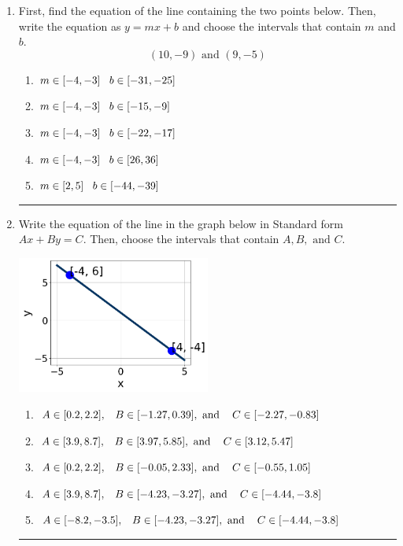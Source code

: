 \documentclass[14pt]{extbook}
\newcommand{\litem}[1]{\item#1\hspace*{-1cm}\rule{\textwidth}{0.4pt}}
\begin{document}
\begin{enumerate}
{\begin{enumerate}[label=\Alph*.]
\end{enumerate} }
\litem{
First, find the equation of the line containing the two points below. Then, write the equation as $ y=mx+b $ and choose the intervals that contain $m$ and $b$.\[ (10, -9) \text{ and } (9, -5) \]\begin{enumerate}[label=\Alph*.]
\item \( m \in [-4, -3] \hspace*{3mm} b \in [-31, -25] \)
\item \( m \in [-4, -3] \hspace*{3mm} b \in [-15, -9] \)
\item \( m \in [-4, -3] \hspace*{3mm} b \in [-22, -17] \)
\item \( m \in [-4, -3] \hspace*{3mm} b \in [26, 36] \)
\item \( m \in [2, 5] \hspace*{3mm} b \in [-44, -39] \)

\end{enumerate} }
\litem{
Write the equation of the line in the graph below in Standard form $Ax+By=C$. Then, choose the intervals that contain $A, B, \text{ and } C$.
\begin{center}
    \includegraphics[width=0.5\textwidth]{../Figures/linearGraphToStandardCopyC.png}
\end{center}
\begin{enumerate}[label=\Alph*.]
\item \( A \in [0.2, 2.2], \hspace{3mm} B \in [-1.27, 0.39], \text{ and } \hspace{3mm} C \in [-2.27, -0.83] \)
\item \( A \in [3.9, 8.7], \hspace{3mm} B \in [3.97, 5.85], \text{ and } \hspace{3mm} C \in [3.12, 5.47] \)
\item \( A \in [0.2, 2.2], \hspace{3mm} B \in [-0.05, 2.33], \text{ and } \hspace{3mm} C \in [-0.55, 1.05] \)
\item \( A \in [3.9, 8.7], \hspace{3mm} B \in [-4.23, -3.27], \text{ and } \hspace{3mm} C \in [-4.44, -3.8] \)
\item \( A \in [-8.2, -3.5], \hspace{3mm} B \in [-4.23, -3.27], \text{ and } \hspace{3mm} C \in [-4.44, -3.8] \)

\end{enumerate} }
\end{enumerate}
\end{document}
